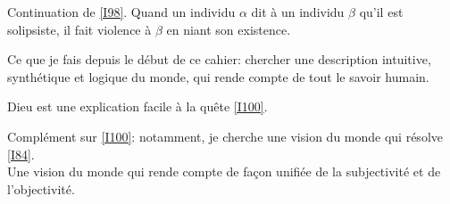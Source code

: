 \documentclass[11pt,a4paper]{article}
\begin{document}
\begin{I}
Continuation de \ref{I98}. Quand un individu $\alpha$ dit à un individu $\beta$ qu'il est solipsiste, il fait 
violence à $\beta$ en niant son existence.
\end{I}

\begin{I}
Ce que je fais depuis le début de ce cahier: chercher une description intuitive, synthétique et logique du monde, qui rende compte de tout le savoir humain.
\end{I}

\begin{I}
Dieu est une explication facile à la quête \ref{I100}.
\end{I}

\begin{I}
Complément sur \ref{I100}: notamment, je cherche une vision du monde qui résolve \ref{I84}.\\
Une vision du monde qui rende compte de façon unifiée de la subjectivité et de l'objectivité.
\end{I}
\end{document}

